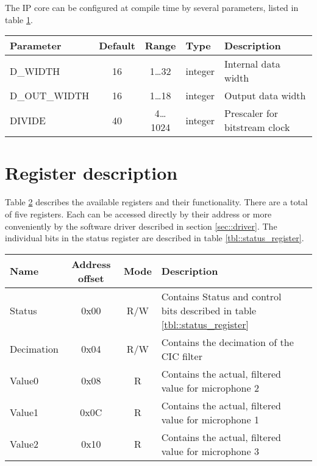The IP core can be configured at compile time by several parameters, listed in table \ref{tbl::parameters}.
\begin{table}[h]
	\centering
	\label{tbl::parameters}
	\begin{tabular}{|l|c|c|l|l|}
		\hline 
		Parameter & Default & Range & Type & Description \\ 
		\hline 
		D\_WIDTH & 16 & 1\ldots32 & integer & Internal data width \\
		\hline 
		D\_OUT\_WIDTH & 16 & 1\ldots18 & integer & Output data width \\
		\hline 
		DIVIDE & 40 & 4\ldots1024 & integer & Prescaler for bitstream clock \\
		\hline 
	\end{tabular} 
\end{table}

\newpage

\section{Register description}
\label{sec::registers}
Table \ref{tbl::register_space} describes the available registers and their functionality.
There are a total of five registers.
Each can be accessed directly by their address or more conveniently by the software driver described in section \ref{sec::driver}.
The individual bits in the status register are described in table  \ref{tbl::status_register}.

\begin{table}[h]
	\centering
	\label{tbl::register_space}
	\begin{tabular}{|l|c|c|l|l|}
		\hline 
		Name & Address offset & Mode & Description \\
		\hline 
		Status & 0x00 & R/W & Contains Status and control bits described in table \ref{tbl::status_register} \\
		\hline 
		Decimation & 0x04 & R/W & Contains the decimation of the CIC filter \\
		\hline 
		Value0 & 0x08 & R & Contains the actual, filtered value for microphone 2 \\
		\hline 
		Value1 & 0x0C & R & Contains the actual, filtered value for microphone 1 \\
		\hline 
		Value2 & 0x10 & R & Contains the actual, filtered value for microphone 3 \\
		\hline 
	\end{tabular} 
\end{table}

